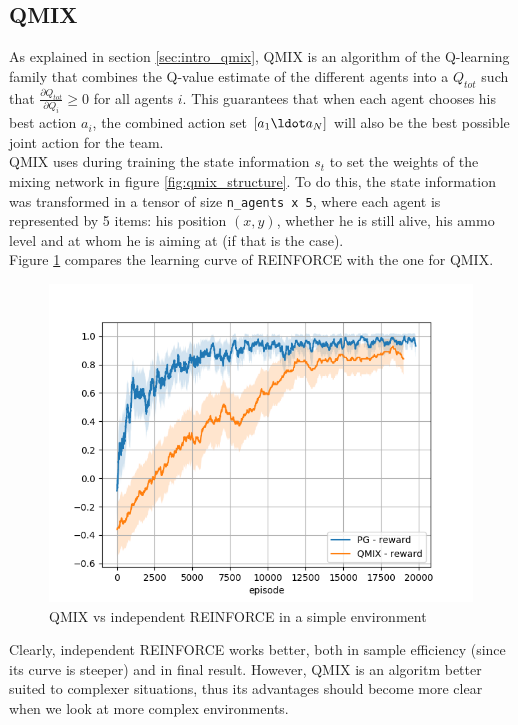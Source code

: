\subsection{QMIX}
As explained in section \ref{sec:intro_qmix}, QMIX is an algorithm of the Q-learning family that combines the Q-value estimate of the different agents into a $Q_{tot}$ such that $\frac{\partial Q_{tot}}{\partial Q_i} \geq 0$ for all agents $i$. This guarantees that when each agent chooses his best action $a_i$, the combined action set $[a_1 \ldot a_N]$ will also be the best possible joint action for the team.\\
QMIX uses during training the state information $s_t$ to set the weights of the mixing network in figure \ref{fig:qmix_structure}. To do this, the state information was transformed in a tensor of size {\tt n\_agents x 5}, where each agent is represented by 5 items: his position $(x, y)$, whether he is still alive, his ammo level and at whom he is aiming at (if that is the case).\\
Figure \ref{fig:comp_qmix_pg} compares the learning curve of REINFORCE with the one for QMIX.
\begin{figure}[htp]
    \centering
    \includegraphics[width=16cm]{images/experiment5/pg_v_qmix_simple.png}
    \caption{QMIX vs independent REINFORCE in a simple environment}
    \label{fig:comp_qmix_pg}
\end{figure}
Clearly, independent REINFORCE works better, both in sample efficiency (since its curve is steeper) and in final result. However, QMIX is an algoritm better suited to complexer situations, thus its advantages should become more clear when we look at more complex environments.

